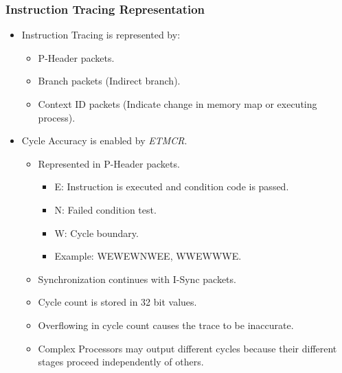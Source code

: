 \documentclass{beamer}
\begin{document}
\begin{frame}
    \frametitle{Instruction Tracing Representation}
    \begin{itemize}
        \item Instruction Tracing is represented by:
            \begin{itemize}
                \item P-Header packets.
                \item Branch packets (Indirect branch).
                \item Context ID packets (Indicate change in memory map or
                    executing process).
            \end{itemize}
        \item Cycle Accuracy is enabled by \textit{ETMCR}.
            \begin{itemize}
                \item Represented in P-Header packets.
                    \begin{itemize}
                        \item E: Instruction is executed and condition code is
                            passed.
                        \item N: Failed condition test.
                        \item W: Cycle boundary.
                        \item Example: WEWEWNWEE, WWEWWWE.
                    \end{itemize}
                \item Synchronization continues with I-Sync packets.
                \item Cycle count is stored in 32 bit values.
                \item Overflowing in cycle count causes the trace to be
                    inaccurate.
                \item Complex Processors may output different cycles because
                    their different stages proceed independently of others.
            \end{itemize}
    \end{itemize}
\end{frame}
\end{document}
